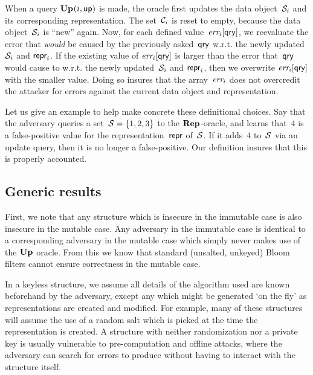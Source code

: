 When a query $\mathbf{Up}\hspace{0.5pt}(i,\mathsf{up})$ is made, the oracle first updates the data object~$\mathcal{S}_i$ and its corresponding representation.  The set~$\mathcal{C}_i$ is reset to empty, because the data object~$\mathcal{S}_i$ is ``new'' again.
%
Now, for each defined value~$\textit{err}_i[\mathsf{qry}]$, we reevaluate the error that \emph{would} be caused by the previously asked~$\mathsf{qry}$ w.r.t. the newly updated $\mathcal{S}_i$ and $\mathsf{repr}_i$.  If the existing value of $\textit{err}_i[\mathsf{qry}]$ is larger than the error that~$\mathsf{qry}$ would cause to w.r.t. the newly updated~$\mathcal{S}_i$ and $\mathsf{repr}_i$, then we overwrite $\textit{err}_i[\mathsf{qry}]$ with the smaller value.  Doing so insures that the array~$\textit{err}_i$ does not overcredit the attacker for errors against the current data object and representation.

Let us give an example to help make concrete these definitional choices.  Say that the adversary queries a set~$\mathcal{S} = \{1,2,3\}$ to the $\mathbf{Rep}\hspace{0.5pt}$-oracle, and learns that~$4$ is a false-positive value for the representation~$\mathsf{repr}$ of~$\mathcal{S}$.  If it adds~$4$ to~$\mathcal{S}$ via an update query, then it is no longer a false-positive.  Our definition insures that this is properly accounted.

\subsection{Generic results}
First, we note that any structure which is insecure in the immutable case is also insecure in the mutable case. Any adversary in the immutable case is identical to a corresponding adversary in the mutable case which simply never makes use of the $\mathbf{Up}\hspace{0.5pt}$ oracle. From this we know that standard (unsalted, unkeyed) Bloom filters cannot ensure correctness in the mutable case. 



In a keyless structure, we assume all details of the algorithm used are known beforehand by the adversary, except any which might be generated `on the fly' as representations are created and modified. For example, many of these structures will assume the use of a random salt which is picked at the time the representation is created. A structure with neither randomization nor a private key is usually vulnerable to pre-computation and offline attacks, where the adversary can search for errors to produce without having to interact with the structure itself.

